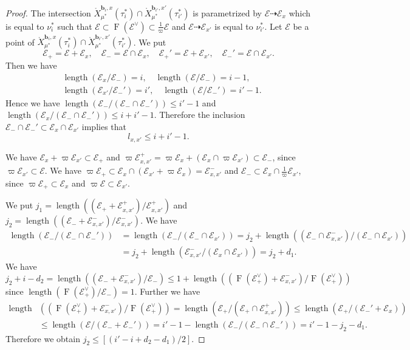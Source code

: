 \documentclass[12pt,a4paper]{article}
\DeclareMathOperator{\length}{length}
\DeclareMathOperator{\oF}{F}
\newcommand{\bfb}{\mathbf{b}}
\newcommand{\cE}{\mathcal{E}}
\begin{document}
\begin{proof}
The intersection 
$\mathring{X}_{\mu^*}^{\bfb_i,x}(\tau_i^*) \cap
 \mathring{X}_{\mu^*}^{\bfb_{i'},x'}(\tau_{i'}^*)$ 
is parametrized by 
$\cE \dashrightarrow \cE_x$ which is equal to 
$\nu_i^*$ such that 
$\cE \subset \oF (\cE^{\vee}) \subset \frac{1}{\varpi} \cE$ 
and 
$\cE \dashrightarrow \cE_{x'}$ 
is equal to $\nu_{i'}^*$. 
Let $\cE$ be a point of 
$\mathring{X}_{\mu^*}^{\bfb_i,x}(\tau_i^*) \cap \mathring{X}_{\mu^*}^{\bfb_{i'},x'}(\tau_{i'}^*)$. 
We put 
\[
 \cE_+=\cE +\cE_x, \quad 
 \cE_-=\cE \cap \cE_x, \quad 
 \cE_+'=\cE +\cE_{x'}, \quad
 \cE_-'=\cE \cap \cE_{x'}. 
\]
Then we have 
\begin{align*}
&\length (\cE_x/\cE_-)=i, \quad 
\length (\cE/\cE_-)=i-1, \\ 
&\length (\cE_{x'}/\cE_-')= i', \quad 
\length (\cE/\cE_-') = i' -1. 
\end{align*}
Hence we have 
$\length(\cE_-/(\cE_- \cap \cE_-')) \leq i' -1$ and 
$\length (\cE_x/(\cE_- \cap \cE_-')) \leq i+i' -1$. 
Therefore the inclusion 
$\cE_- \cap \cE_-' \subset \cE_x \cap \cE_{x'}$ implies that 
\[
 l_{x,x'} \leq i+i' -1. 
\]

We have 
$\cE_x +\varpi \cE_{x'} \subset \cE_+$ and 
$\varpi \cE_{x,x'}^+ =\varpi \cE_x +(\cE_x \cap \varpi \cE_{x'}) \subset \cE_-$, 
since $\varpi \cE_{x'} \subset \cE$. 
We have 
$\varpi \cE_+ \subset \cE_x \cap (\cE_{x'}+\varpi \cE_x)=\cE_{x,x'}^-$ and  
$\cE_- \subset \cE_x \cap \frac{1}{\varpi} \cE_{x'}$, 
since $\varpi \cE_+ \subset \cE_x$ and 
$\varpi \cE \subset \cE_{x'}$. 

We put $j_1=\length ((\cE_+ +\cE_{x,x'}^+ )/ \cE_{x,x'}^+ )$ 
and $j_2=\length ((\cE_- +\cE_{x,x'}^- )/\cE_{x,x'}^- )$. 
We have 
\begin{align*}
 \length (\cE_- / (\cE_- \cap \cE_-')) 
 &=\length (\cE_- / (\cE_- \cap \cE_{x'})) 
 =j_2 +\length ((\cE_-\cap \cE_{x,x'}^-) / (\cE_- \cap \cE_{x'}))\\ 
 &=j_2 +\length (\cE_{x,x'}^-/ (\cE_x \cap \cE_{x'})) = j_2 +d_1. 
\end{align*}
We have 
\[
 j_2 +i-d_2 = \length ((\cE_- + \cE_{x,x'}^-)/\cE_-) 
 \leq 1+\length ((\oF (\cE_+^{\vee}) + \cE_{x,x'}^-)/\oF (\cE_+^{\vee}))
\] 
since $\length (\oF (\cE_+^{\vee})/\cE_-)=1$. 
Further we have 
\begin{align*}
 \length & ((\oF (\cE_+^{\vee}) + \cE_{x,x'}^-)/\oF (\cE_+^{\vee}))
 = \length (\cE_+ / (\cE_+ \cap \cE_{x,x'}^+)) 
 \leq \length (\cE_+ / (\cE_-' +\cE_x )) \\ 
 &\leq 
 \length (\cE / (\cE_- +\cE_-'))
 =  i'-1-\length (\cE_- / (\cE_- \cap \cE_-')) 
 =i'-1-j_2 -d_1. 
\end{align*}
Therefore we obtain 
$j_2  \leq  [(i'-i+d_2 -d_1 )/2]$. 


\end{proof}
\end{document}
